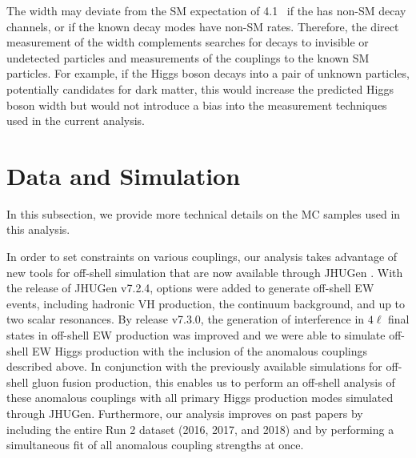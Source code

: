 The \Hboson width may deviate from the SM expectation of 4.1\MeV~\cite{deFlorian:2016spz}
if the \Hboson has non-SM decay channels, or if the known decay modes have non-SM rates. 
Therefore, the direct measurement of the \Hboson width complements searches for \Hboson decays to invisible 
or undetected particles and measurements of the \Hboson couplings to the known SM particles.
For example, if the Higgs boson decays into a pair of unknown particles, potentially candidates 
for dark matter, this would increase the predicted Higgs boson width but 
would not introduce a bias into the measurement techniques used in the current analysis. 




\section{Data and Simulation}

In this subsection, we provide more technical details on the MC samples used in this analysis.

In order to set constraints on various couplings, our analysis takes advantage of new tools for off-shell simulation that are now available through JHUGen \cite{2010,2012,2014,2016,2020,2021}. With the release of JHUGen v7.2.4, options were added to generate off-shell EW events, including hadronic VH production, the continuum background, and up to two scalar resonances. By release v7.3.0, the generation of interference in $4\ell$ final states in off-shell EW production was improved and we were able to simulate off-shell EW Higgs production with the inclusion of the anomalous couplings described above. In conjunction with the previously available simulations for off-shell gluon fusion production, this enables us to perform an off-shell analysis of these anomalous couplings with all primary Higgs production modes simulated through JHUGen. Furthermore, our analysis improves on past papers \cite{190100174} by including the entire Run 2 dataset (2016, 2017, and 2018) and by performing a simultaneous fit of all anomalous coupling strengths at once. 


